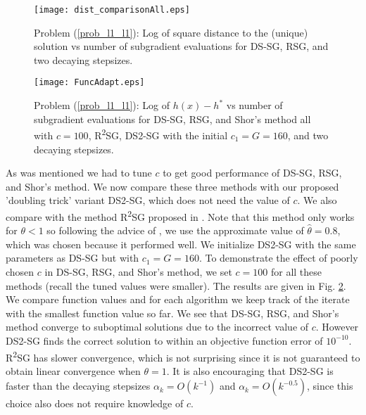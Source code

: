 \begin{figure}
\centering
\texttt{[image: dist\_comparisonAll.eps]}

\caption{Problem (\ref{prob_l1_l1}): Log of square distance to the (unique) solution vs number of subgradient evaluations for DS-SG, RSG, and two decaying stepsizes.}
\label{fig_compAll}
\end{figure}

\begin{figure}
\centering
\texttt{[image: FuncAdapt.eps]}
\caption{Problem (\ref{prob_l1_l1}): Log of $h(x)-h^*$  vs number of subgradient evaluations for DS-SG, RSG, and Shor's method all with $c=100$, R\textsuperscript{2}SG, DS2-SG with the initial $c_1=G=160$, and two decaying stepsizes.}
\label{fig_ad}
\end{figure}

As was mentioned we had to tune $c$ to get good performance of DS-SG, RSG, and Shor's method. We now compare these three methods with our proposed 'doubling trick' variant DS2-SG, which does not need the value of $c$. We also compare with the method R\textsuperscript{2}SG proposed in \cite{yang2015rsg}. Note that this method only works for $\theta<1$ so following the advice of \cite{yang2015rsg}, we use the approximate value of $\hat{\theta}=0.8$, which was chosen because it performed well.  We initialize DS2-SG with the same parameters as DS-SG but with $c_1 = G = 160$. To demonstrate the effect of poorly chosen $c$ in DS-SG, RSG, and Shor's method, we set $c=100$ for all these methods (recall the tuned values were smaller). The results are given in Fig. \ref{fig_ad}. We compare function values and for each algorithm we keep track of the iterate with the smallest function value so far. We see that DS-SG, RSG, and Shor's method converge to suboptimal solutions due to the incorrect value of $c$. However DS2-SG finds the correct solution to within an objective function error of $10^{-10}$. R\textsuperscript{2}SG has slower convergence, which is not surprising since it is not guaranteed to obtain linear convergence when $\theta=1$. It is also encouraging that DS2-SG is faster than the decaying stepsizes $\alpha_k=O( k^{-1})$ and $\alpha_k=O(k^{-0.5})$, since this choice also does not require knowledge of $c$.

